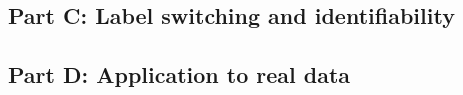 \documentclass[
  11pt,
  a4paper,
]{article}
\begin{document}
\hypertarget{part-c-label-switching-and-identifiability}{%
\subsection{Part C: Label switching and
identifiability}\label{part-c-label-switching-and-identifiability}}

\hypertarget{part-d-application-to-real-data}{%
\subsection{Part D: Application to real
data}\label{part-d-application-to-real-data}}
\end{document}
